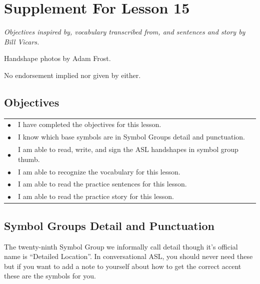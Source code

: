 \documentclass{article}
\begin{document}
\newfontfamily{}
\newfontfamily{}
\newcommand{\bul}{\hfil$\bullet$&}
\renewenvironment{glossary}{\begin{multicols}{5}\begin{center}}{\end{center}\end{multicols}}
\setcounter{secnumdepth}{0}
\setlength{\columnseprule}{1pt}

\section{Supplement For Lesson 15}

\begin{center}
\it
Objectives inspired by, vocabulary transcribed from, and sentences and story by Bill Vicars.

Handshape photos by Adam Frost.

No endorsement implied nor given by either.
\end{center}

\subsection{Objectives}

\begin{tabular}{p{1cm}p{14cm}}
\bul I have completed the objectives for this lesson.\\
\bul I know which base symbols are in Symbol Groups detail and punctuation.\\
\bul I am able to read, write, and sign the ASL handshapes in symbol group thumb.\\
\bul I am able to recognize the vocabulary for this lesson.\\
\bul I am able to read the practice sentences for this lesson.\\
\bul I am able to read the practice story for this lesson.\\
\end{tabular}

\subsection{Symbol Groups Detail and Punctuation}

The twenty-ninth Symbol Group we informally call detail though it's official name is ``Detailed Location''.
In conversational ASL, you should never need these but if you want to add a note to yourself about how to get the correct accent these are the symbols for you.
\end{document}
